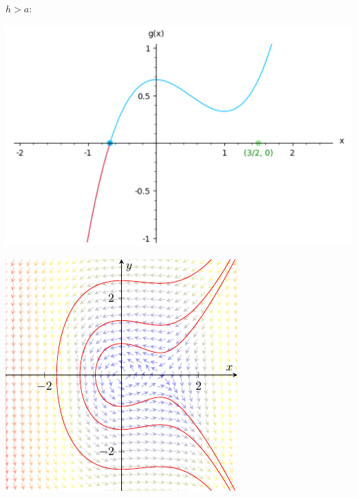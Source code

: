 \documentclass[10pt,a4paper]{article}
\begin{document}
\underline{$h>a$}:
\begin{center}
  \begin{minipage}[h]{0.57\textwidth}\hspace{3mm}
    \includegraphics[scale=0.36]{Images/gh=2i6}
    \label{gh=2i6}
  \end{minipage}\hfill
  \begin{minipage}[h]{0.43\textwidth}
    \includegraphics[scale=1.1]{Images/retrat2h2i6}
    \label{retrat2i6}
  \end{minipage}
\end{center}
\end{document}
